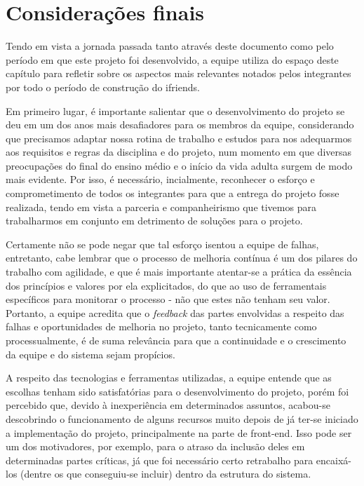 
\chapter{Considerações finais}
Tendo em vista a jornada passada tanto através deste documento como pelo período em que este projeto foi desenvolvido, a equipe utiliza do espaço deste capítulo para
refletir sobre os aspectos mais relevantes notados pelos integrantes por todo o período de
construção do \gls{ifriends}.

Em primeiro lugar, é importante salientar que o desenvolvimento do projeto se deu em um dos anos mais desafiadores para os membros da equipe, considerando que precisamos adaptar nossa rotina de trabalho e estudos para nos adequarmos aos requisitos e regras da disciplina e do projeto, num momento em que diversas preocupações do final do ensino médio e o início da vida adulta surgem de modo mais evidente. Por isso, é necessário, incialmente, reconhecer o esforço e comprometimento de todos os integrantes para que a entrega do projeto fosse realizada, tendo em vista a parceria e companheirismo que tivemos para trabalharmos em conjunto em detrimento de soluções para o projeto.

Certamente não se pode negar que tal esforço isentou a equipe de falhas, entretanto, cabe lembrar que o processo de melhoria contínua é um dos pilares do trabalho com agilidade, e que é mais importante atentar-se a prática da essência dos princípios e valores por ela explicitados, do que ao uso de ferramentais específicos para monitorar o processo - não que estes não tenham seu valor. Portanto, a equipe acredita que o \textsl{feedback} das partes envolvidas a respeito das falhas e oportunidades de melhoria no projeto, tanto tecnicamente como processualmente, é de suma relevância para que a continuidade e o crescimento da equipe e do sistema sejam propícios.

A respeito das tecnologias e ferramentas utilizadas, a equipe entende que as escolhas tenham sido satisfatórias para o desenvolvimento do projeto, porém foi percebido que, devido à inexperiência em determinados assuntos, acabou-se descobrindo o funcionamento de alguns recursos muito depois de já ter-se iniciado a implementação do projeto, principalmente na parte de \gls{front-end}. Isso pode ser um dos motivadores, por exemplo, para o atraso da inclusão deles em determinadas partes críticas, já que foi necessário certo retrabalho para encaixá-los (dentre os que conseguiu-se incluir) dentro da estrutura do sistema.

